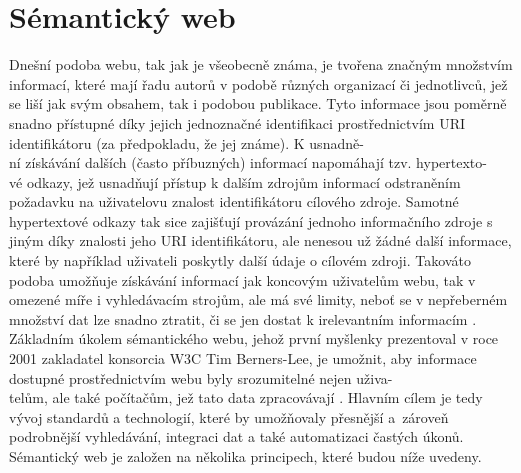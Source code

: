 \documentclass{projekt}
\begin{document}
\chapter{Sémantický web}
\hspace{0.65cm}Dnešní podoba webu, tak jak je všeobecně známa, je tvořena značným množstvím informací, které mají řadu autorů v podobě různých organizací či jednotlivců, jež se liší jak svým obsahem, tak i podobou publikace. Tyto informace jsou poměrně snadno přístupné díky jejich jednoznačné identifikaci prostřednictvím URI identifikátoru (za předpokladu, že jej známe). K usnadně-\\ní získávání dalších (často příbuzných) informací napomáhají tzv. hypertexto-\\vé odkazy, jež usnadňují přístup k dalším zdrojům informací odstraněním požadavku na uživatelovu znalost identifikátoru cílového zdroje. Samotné hypertextové odkazy tak sice zajišťují provázání jednoho informačního zdroje s jiným díky znalosti jeho URI identifikátoru, ale nenesou už žádné další informace, které by například uživateli poskytly další údaje o cílovém zdroji. 
Takováto podoba umožňuje získávání informací jak koncovým uživatelům webu, tak v omezené míře i vyhledávacím strojům, ale má své limity, neboť se v nepřeberném množství dat lze snadno ztratit, či se jen dostat k irelevantním informacím \cite{_1}.
Základním úkolem sémantického webu, jehož první myšlenky prezentoval v roce 2001 zakladatel konsorcia W3C Tim Berners-Lee, je umožnit, aby informace dostupné prostřednictvím webu byly srozumitelné nejen uživa-\\telům, ale také počítačům, jež tato data zpracovávají \cite{_2}. Hlavním cílem je tedy vývoj standardů a technologií, které by umožňovaly přesnější a~zároveň podrobnější vyhledávání, integraci dat a také automatizaci častých úkonů. 
Sémantický web je založen na několika principech, které budou níže uvedeny.
\end{document}
